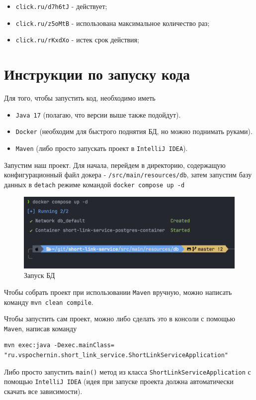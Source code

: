 \documentclass[a4paper, 14pt]{article}
\begin{document}
\begin{itemize}
	\item \texttt{click.ru/d7h6tJ} - действует;
	\item \texttt{click.ru/z5oMtB} - использована максимальное количество раз;
	\item \texttt{click.ru/rKxdXo} - истек срок действия;
\end{itemize}

\newpage
\section{Инструкции по запуску кода}

Для того, чтобы запустить код, необходимо иметь

\begin{itemize}
	\item \texttt{Java 17} (полагаю, что версии выше также подойдут).
	\item \texttt{Docker} (необходим для быстрого поднятия БД, но можно поднимать руками).
	\item \texttt{Maven} (либо просто запускать проект в \texttt{IntelliJ IDEA}).
\end{itemize}

Запустим наш проект. Для начала, перейдем в директорию, содержащую конфигурационный файл докера - \texttt{/src/main/resources/db}, затем запустим базу данных в \texttt{detach} режиме командой \texttt{docker compose up -d}

\begin{figure}[H]
	\centering
	\includegraphics[width=17cm]{resources/1.png}
	\caption{Запуск БД}
\end{figure}

Чтобы собрать проект при использовании \texttt{Maven} вручную, можно написать команду \texttt{mvn clean compile}.

Чтобы запустить сам проект, можно либо сделать это в консоли с помощью \texttt{Maven}, написав команду
\begin{verbatim}
mvn exec:java -Dexec.mainClass=
"ru.vspochernin.short_link_service.ShortLinkServiceApplication"
\end{verbatim}
Либо просто запустить \texttt{main()} метод из класса \texttt{ShortLinkServiceApplication} с помощью \texttt{IntelliJ IDEA} (идея при запуске проекта должна автоматически скачать все зависимости).
\end{document}
